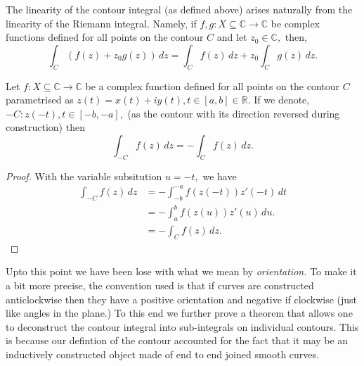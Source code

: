 \documentclass[12pt]{book}
\begin{document}
The linearity of the contour integral (as defined above) arises naturally from the linearity of the Riemann integral. Namely, if $f, g: X \subseteq \mathbb{C} \rightarrow \mathbb{C}$ be complex functions defined for all points on the contour $C$ and let $z_0 \in \mathbb{C},$ then,
\[
    \int_{C} (f(z) + z_0g(z))\,dz = \int_{C} f(z)\,dz + z_0\int_{C} g(z)\,dz.
\]

\begin{thm}
    Let $f: X \subseteq \mathbb{C} \rightarrow \mathbb{C}$ be a complex function defined for all points on the contour $C$ parametrised as $z(t) = x(t) + iy(t), t \in [a, b] \in \mathbb{R}.$ If we denote, $-C: z(-t), t \in [-b, -a],$ (as the contour with its direction reversed during construction) then
    \[
        \int_{-C} f(z)\,dz = -\int_{C} f(z)\,dz.
    \]
\end{thm}
\begin{proof}
    With the variable subsitution $u = -t,$ we have
    \begin{align*}
        \int_{-C} f(z)\,dz 
            &=
                -\int_{-b}^{-a} f(z(-t))z'(-t)\,dt \\
            &=
                -\int_{a}^{b} f(z(u))z'(u)\,du. \\
            &=
                -\int_{C} f(z)\,dz.
    \end{align*}
\end{proof}

Upto this point we have been lose with what we mean by \textit{orientation.} To make it a bit more precise, the convention used is that if curves are constructed anticlockwise then they have a positive orientation and negative if clockwise (just like angles in the plane.) To this end we further prove a theorem that allows one to deconstruct the contour integral into sub-integrals on individual contours. This is because our defintion of the contour accounted for the fact that it may be an inductively constructed object made of end to end joined smooth curves.
\end{document}

